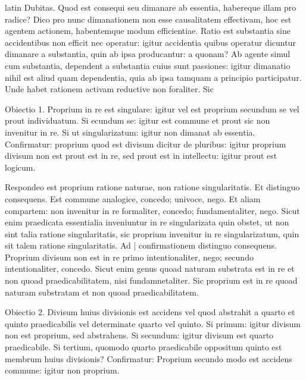 \begin{otherlanguage*}{latin}
\pstart
Dubitas. Quod est consequi seu dimanare ab essentia, habereque illam pro radice? Dico pro nunc dimanationem non esse causalitatem effectivam, hoc est agentem actionem, habentemque modum efficientiae. Ratio est substantia sine accidentibus non efficit nec operatur:
igitur accidentia quibus operatur dicuntur dimanare a substantia, quin ab ipsa producantur:
a quonam? Ab agente simul cum substantia, dependent a substantia cuius sunt passiones:
igitur dimanatio nihil est aliud quam dependentia, quia ab ipsa tamquam a principio participatur. Unde habet rationem activam reductive non foraliter. Sic  
\pend

\pstart
Obiectio 1. Proprium in re est singulare:
igitur vel est proprium secundum se vel prout individuatum. Si ecundum se:
igitur est commune et prout sic non invenitur in re. Si ut singularizatum:
igitur non dimanat ab essentia. Confirmatur:
proprium quod est divisum dicitur de pluribus:
igitur proprium divisum non est prout est in re, sed prout est in intellectu:
igitur prout est logicum. 
\pend

\pstart
Respondeo est proprium ratione naturae, non ratione singularitatis. Et distinguo consequens. Est commune analogice, concedo; univoce, nego. Et aliam compartem:
non invenitur in re formaliter, concedo; fundamentaliter, nego. Sicut enim praedicata essentialia inveniuntur in re singularizata quin obstet, ut non sint talia ratione singularitatis, sic proprium invenitur in re singularizatum, quin sit talem ratione singularitatis. Ad \textnormal{|} confirmationem distinguo consequens. Proprium divisum non est in re primo intentionaliter, nego; secundo intentionaliter, concedo. Sicut enim genus quoad naturam substrata est in re et non quoad praedicabilitatem, nisi fundamnetaliter. Sic proprium est in re quoad naturam substratam et non quoad praedicabilitatem. 
\pend

\pstart
Obiectio 2. Divisum huius divisionis est accidens vel quod abstrahit a quarto et quinto praedicabilis vel determinate quarto vel quinto. Si primum:
igitur divisum non est proprium, sed abstrahens. Si secundum:
igitur divisum est quarto praedicabile. Si tertium, quomodo quarto praedicabile oppositum quinto est membrum huius divisionis? Confirmatur:
Proprium secundo modo est accidens commune:
igitur non proprium. 
\pend


\end{otherlanguage*}
